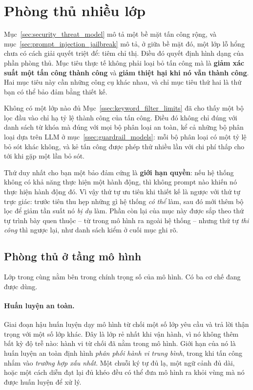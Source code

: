 
\section{Phòng thủ nhiều lớp}
\label{sec:defense_layers}

Mục~\ref{sec:security_threat_model} mô tả một bề mặt tấn công rộng, và mục~\ref{sec:prompt_injection_jailbreak} mô tả, ở giữa bề mặt đó, một lớp lỗ hổng chưa có cách giải quyết triệt để: tiêm chỉ thị. Điều đó quyết định hình dạng của phần phòng thủ. Mục tiêu thực tế không phải loại bỏ tấn công mà là \textbf{giảm xác suất một tấn công thành công} và \textbf{giảm thiệt hại khi nó vẫn thành công}. Hai mục tiêu này cần những công cụ khác nhau, và chỉ mục tiêu thứ hai là thứ bạn có thể bảo đảm bằng thiết kế.

\begin{keyidea}{Không có một lớp nào đủ}
Mục~\ref{ssec:keyword_filter_limits} đã cho thấy một bộ lọc đầu vào chỉ hạ tỷ lệ thành công của tấn công. Điều đó không chỉ đúng với danh sách từ khóa mà đúng với mọi bộ phân loại an toàn, kể cả những bộ phân loại dựa trên LLM ở mục~\ref{ssec:guardrail_models}: mỗi bộ phân loại có một tỷ lệ bỏ sót khác không, và kẻ tấn công được phép thử nhiều lần với chi phí thấp cho tới khi gặp một lần bỏ sót.

Thứ duy nhất cho bạn một bảo đảm cứng là \textbf{giới hạn quyền}: nếu hệ thống không có khả năng thực hiện một hành động, thì không prompt nào khiến nó thực hiện hành động đó. Vì vậy thứ tự ưu tiên khi thiết kế là ngược với thứ tự trực giác: trước tiên thu hẹp những gì hệ thống \emph{có thể} làm, sau đó mới thêm bộ lọc để giảm tần suất nó \emph{bị dụ} làm. Phần còn lại của mục này được sắp theo thứ tự trình bày quen thuộc -- từ trong mô hình ra ngoài hệ thống -- nhưng thứ tự \emph{thi công} thì ngược lại, như danh sách kiểm ở cuối mục ghi rõ.
\end{keyidea}

\subsection{Phòng thủ ở tầng mô hình}
\label{ssec:model_layer_defense}

Lớp trong cùng nằm bên trong chính trọng số của mô hình. Có ba cơ chế đang được dùng.

\paragraph{Huấn luyện an toàn.} Giai đoạn hậu huấn luyện dạy mô hình từ chối một số lớp yêu cầu và trả lời thận trọng với một số lớp khác. Đây là lớp rẻ nhất khi vận hành, vì nó không thêm bất kỳ độ trễ nào: hành vi từ chối đã nằm trong mô hình. Giới hạn của nó là huấn luyện an toàn định hình \emph{phân phối hành vi trung bình}, trong khi tấn công nhắm vào \emph{trường hợp xấu nhất}. Một chuỗi ký tự đủ lạ, một ngữ cảnh đủ dài, hoặc một cách diễn đạt lại đủ khéo đều có thể đưa mô hình ra khỏi vùng mà nó được huấn luyện để xử lý.


